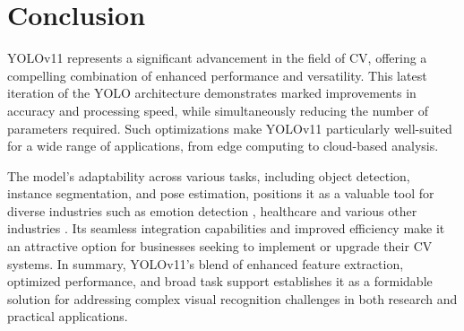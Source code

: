 \documentclass{article}
\begin{document}
\section{Conclusion}
YOLOv11 represents a significant advancement in the field of CV, offering a compelling combination of enhanced performance and versatility. This latest iteration of the YOLO architecture demonstrates marked improvements in accuracy and processing speed, while simultaneously reducing the number of parameters required. Such optimizations make YOLOv11 particularly well-suited for a wide range of applications, from edge computing to cloud-based analysis.

The model's adaptability across various tasks, including object detection, instance segmentation, and pose estimation, positions it as a valuable tool for diverse industries such as emotion detection \cite{hussain2023child}, healthcare \cite{aydin2023domain} and various other industries \cite{khanam2024comprehensive}. Its seamless integration capabilities and improved efficiency make it an attractive option for businesses seeking to implement or upgrade their CV systems. In summary, YOLOv11's blend of enhanced feature extraction, optimized performance, and broad task support establishes it as a formidable solution for addressing complex visual recognition challenges in both research and practical applications.

\vspace{6pt} 



\end{document}
